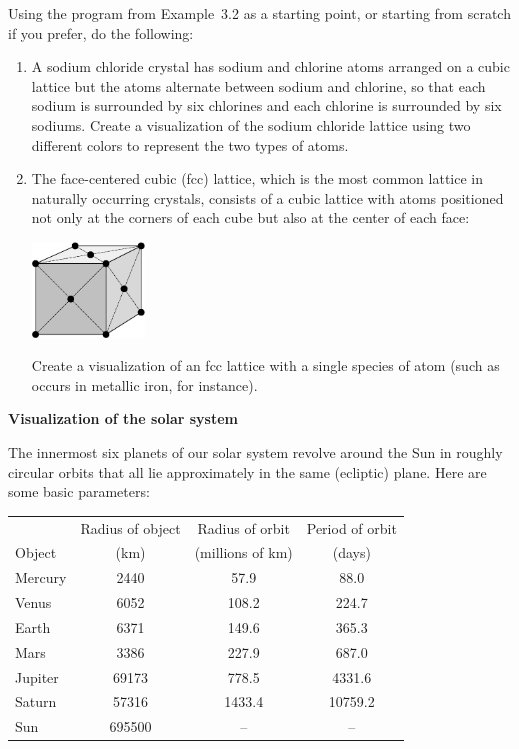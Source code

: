 \documentclass[12pt]{article}
\begin{document}
\begin{exercises}
\exercise Using the program from Example~3.2 as a starting point, or
starting from scratch if you prefer, do the following:
\begin{enumerate}\setlength{\itemsep}{0pt}
\item A sodium chloride crystal has sodium and chlorine atoms
  arranged on a cubic lattice but the atoms alternate between sodium and
  chlorine, so that each sodium is surrounded by six chlorines and each
  chlorine is surrounded by six sodiums.  Create a visualization of the
  sodium chloride lattice using two different colors to represent the two
  types of atoms.
\item The face-centered cubic (fcc) lattice, which is the most common
  lattice in naturally occurring crystals, consists of a cubic lattice with
  atoms positioned not only at the corners of each cube but also at the
  center of each face:
\medskip
\begin{center}
\includegraphics[width=3cm]{fcc.eps}
\end{center}
Create a visualization of an fcc lattice with a single species of atom
(such as occurs in metallic iron, for instance).
\end{enumerate}



\exercise \textbf{Visualization of the solar system}

\exskip The innermost six planets of our solar system revolve around the
Sun in roughly circular orbits that all lie approximately in the same
(ecliptic) plane.  Here are some basic parameters:
\begin{center}
\setlength{\tabcolsep}{8pt}
\begin{tabular}{l|ccc}
       & Radius of object & Radius of orbit  & Period of orbit \\
Object &       (km)       & (millions of km) &     (days)      \\
\hline
Mercury & 2440                  & 57.9                             & 88.0                   \\
Venus   & 6052                  & 108.2                            & 224.7                  \\
Earth   & 6371                  & 149.6                            & 365.3                  \\
Mars    & 3386                  & 227.9                            & 687.0                  \\
Jupiter & 69173                 & 778.5                            & 4331.6                 \\
Saturn  & 57316                 & 1433.4                           & 10759.2                \\
Sun     & 695500                & --                               & --


\end{tabular}
\end{center}
\end{exercises}
\end{document}
